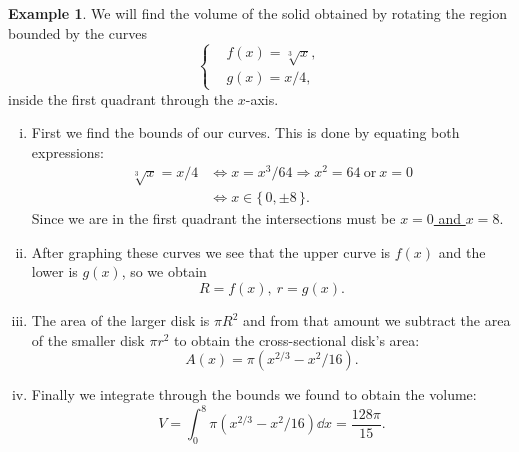 \documentclass[12pt]{article}
\theoremstyle{plain}
\theoremstyle{definition}
\newtheorem{Ex}[Th]{Example}           %
\theoremstyle{remark}
\renewcommand{\:}{\colon}           %
\newcommand{\un}[1]{\underline{#1}}
\renewcommand{\.}{\Cdot}                %
\newcommand{\To}{\Rightarrow}
\newcommand{\set}[1]{\{\,#1\,\}}    %
\begin{document}
\begin{multicols}{2}
\begin{Ex} 
We will find the volume of the solid obtained by rotating the region bounded by the curves 
$$
\left\lbrace
\begin{aligned}
  &f(x)=\sqrt[3]{x},\\
  &g(x)=x/4,
\end{aligned}
\right.
$$
inside the first quadrant through the $x$-axis. 
\begin{enumerate}[i)]
  \itemsep=-0.4em
  \item First we find the bounds of our curves. This is done by equating both expressions:
  \begin{align*}
    \sqrt[3]{x}=x/4&\iff x=x^3/64\To x^2=64\ \text{or}\ x=0\\
    &\iff x\in\set{0,\pm 8}.
  \end{align*}
  Since we are in the first quadrant the intersections must be \un{$x=0$ and $x=8$}.
  \item After graphing these curves we see that the upper curve is $f(x)$ and the lower is $g(x)$, so we obtain 
  $$R=f(x),\ r=g(x).$$
  \item The area of the larger disk is $\pi R^2$ and from that amount we subtract the area of the smaller disk $\pi r^2$ to obtain the cross-sectional disk's area:
  $$A(x)=\pi(x^{2/3}-x^2/16).$$
  \item Finally we integrate through the bounds we found to obtain the volume:
  $$V=\int_0^8\pi(x^{2/3}-x^2/16)\dd x=\frac{128\pi}{15}.$$
\end{enumerate}
\end{Ex}


\end{multicols}
\end{document}
